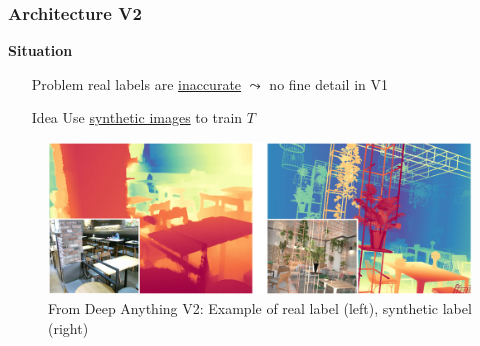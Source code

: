 \documentclass[12pt]{beamer}
\begin{document}
\begin{frame}
    \frametitle{Architecture V2}
    
    \textbf{Situation}
    \begin{itemize}
        \item[Problem] real labels are \underline{inaccurate} $\leadsto$ no fine detail in V1
        \item[Idea] Use \underline{synthetic images} to train $T$
    \end{itemize}
    \pause
    \begin{figure}
        \centering
        \includegraphics[width=\textwidth]{./figures/screeenshot_deepanythingv2_realvssynth.png}
        \caption{From Deep Anything V2: Example of real label (left), synthetic label (right)}
        \label{fig:realvssynth}
    \end{figure}
\end{frame}
\end{document}
